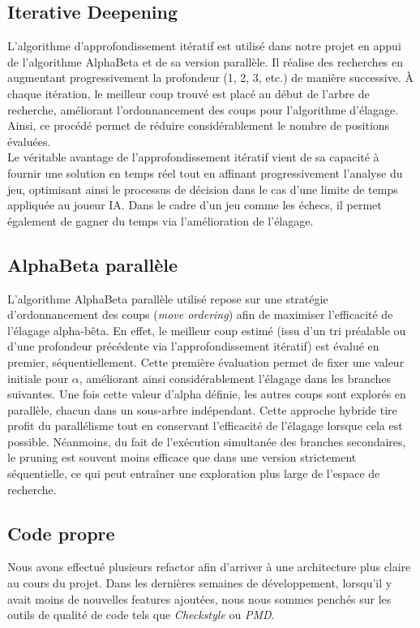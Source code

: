 \documentclass{article}
\begin{document}
\subsection{Iterative Deepening}

L'algorithme d'approfondissement itératif est utilisé dans notre projet en appui de l'algorithme AlphaBeta et de sa version parallèle. Il réalise des recherches en augmentant progressivement la profondeur (1, 2, 3, etc.) de manière successive. À chaque itération, le meilleur coup trouvé est placé au début de l'arbre de recherche, améliorant l'ordonnancement des coups pour l'algorithme d'élagage. Ainsi, ce procédé permet de réduire considérablement le nombre de positions évaluées.\\

Le véritable avantage de l'approfondissement itératif vient de sa capacité à fournir une solution en temps réel tout en affinant progressivement l'analyse du jeu, optimisant ainsi le processus de décision dans le cas d'une limite de temps appliquée au joueur IA.
Dans le cadre d'un jeu comme les échecs, il permet également de gagner du temps via l'amélioration de l'élagage.

\subsection{AlphaBeta parallèle}

L'algorithme AlphaBeta parallèle utilisé repose sur une stratégie d'ordonnancement des coups (\textit{move ordering}) afin de maximiser l'efficacité de l'élagage alpha-bêta. En effet, le meilleur coup estimé (issu d'un tri préalable ou d'une profondeur précédente via l'approfondissement itératif) est évalué en premier, séquentiellement. Cette première évaluation permet de fixer une valeur initiale pour $\alpha$, améliorant ainsi considérablement l'élagage dans les branches suivantes. Une fois cette valeur d'alpha définie, les autres coups sont explorés en parallèle, chacun dans un sous-arbre indépendant. 
Cette approche hybride tire profit du parallélisme tout en conservant l'efficacité de l'élagage lorsque cela est possible. Néanmoins, du fait de l'exécution simultanée des branches secondaires, le pruning est souvent moins efficace que dans une version strictement séquentielle, ce qui peut entraîner une exploration plus large de l'espace de recherche.

\subsection{Code propre}
Nous avons effectué plusieurs refactor afin d'arriver à une architecture plus claire au cours du projet. Dans les dernières semaines de développement, 
lorsqu'il y avait moins de nouvelles features ajoutées, nous nous sommes penchés sur les outils de qualité de code tels que \textit{Checkstyle} ou \textit{PMD}.
\end{document}
